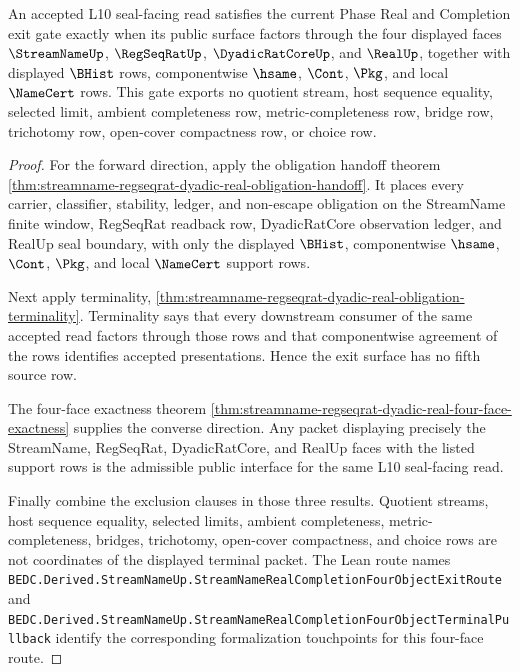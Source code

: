 \begin{theorem}
\label{thm:streamname-l10-four-face-exit-gate}
An accepted L10 seal-facing read satisfies the current Phase Real and Completion exit gate exactly when its public surface factors through the four displayed faces $\StreamNameUp$, $\RegSeqRatUp$, $\DyadicRatCoreUp$, and $\RealUp$, together with displayed $\BHist$ rows, componentwise $\hsame$, $\Cont$, $\Pkg$, and local $\NameCert$ rows. This gate exports no quotient stream, host sequence equality, selected limit, ambient completeness row, metric-completeness row, bridge row, trichotomy row, open-cover compactness row, or choice row.
\end{theorem}
\begin{proof}
For the forward direction, apply the obligation handoff theorem \autoref{thm:streamname-regseqrat-dyadic-real-obligation-handoff}. It places every carrier, classifier, stability, ledger, and non-escape obligation on the StreamName finite window, RegSeqRat readback row, DyadicRatCore observation ledger, and RealUp seal boundary, with only the displayed $\BHist$, componentwise $\hsame$, $\Cont$, $\Pkg$, and local $\NameCert$ support rows.

Next apply terminality, \autoref{thm:streamname-regseqrat-dyadic-real-obligation-terminality}. Terminality says that every downstream consumer of the same accepted read factors through those rows and that componentwise agreement of the rows identifies accepted presentations. Hence the exit surface has no fifth source row.

The four-face exactness theorem \autoref{thm:streamname-regseqrat-dyadic-real-four-face-exactness} supplies the converse direction. Any packet displaying precisely the StreamName, RegSeqRat, DyadicRatCore, and RealUp faces with the listed support rows is the admissible public interface for the same L10 seal-facing read.

Finally combine the exclusion clauses in those three results. Quotient streams, host sequence equality, selected limits, ambient completeness, metric-completeness, bridges, trichotomy, open-cover compactness, and choice rows are not coordinates of the displayed terminal packet. The Lean route names \texttt{BEDC.Derived.StreamNameUp.StreamNameRealCompletionFourObjectExitRoute} and \texttt{BEDC.Derived.StreamNameUp.StreamNameRealCompletionFourObjectTerminalPullback} identify the corresponding formalization touchpoints for this four-face route.
\end{proof}

